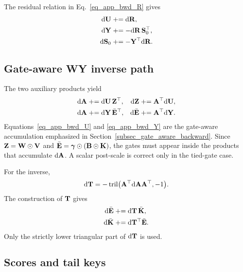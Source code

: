 The residual relation in Eq.~\ref{eq_app_bwd_R} gives
\begin{align}
    \mathrm{d}{\mathbf{U}}
    &\mathrel{+}=
    \mathrm{d}{\mathbf{R}},
\label{eq_app_dU_from_R}\\
    \mathrm{d}{\mathbf{Y}}
    &\mathrel{+}=
    -\mathrm{d}{\mathbf{R}}\,{\mathbf{S}}_0^\top,
\label{eq_app_dY_from_R}\\
    \mathrm{d}{\mathbf{S}}_0
    &\mathrel{+}=
    -{\mathbf{Y}}^\top\mathrm{d}{\mathbf{R}} .
\label{eq_app_dS_from_R}
\end{align}

\subsection{Gate-aware WY inverse path}
\label{app_bwd_wy}

The two auxiliary products yield
\begin{align}
    \mathrm{d}{\mathbf{A}}
    &\mathrel{+}=
    \mathrm{d}{\mathbf{U}}\,{\mathbf{Z}}^\top,
    &
    \mathrm{d}{\mathbf{Z}}
    &\mathrel{+}=
    {\mathbf{A}}^\top\mathrm{d}{\mathbf{U}},
\label{eq_app_bwd_U}\\
    \mathrm{d}{\mathbf{A}}
    &\mathrel{+}=
    \mathrm{d}{\mathbf{Y}}\,\bar{{\mathbf{E}}}^\top,
    &
    \mathrm{d}\bar{{\mathbf{E}}}
    &\mathrel{+}=
    {\mathbf{A}}^\top\mathrm{d}{\mathbf{Y}} .
\label{eq_app_bwd_Y}
\end{align}
Equations~\ref{eq_app_bwd_U} and \ref{eq_app_bwd_Y} are the gate-aware accumulation emphasized in Section~\ref{subsec_gate_aware_backward}. Since ${\mathbf{Z}}={\mathbf{W}}\odot{\mathbf{V}}$ and $\bar{{\mathbf{E}}}=\boldsymbol{\gamma}\odot({\mathbf{B}}\odot{\mathbf{K}})$, the gates must appear inside the products that accumulate $\mathrm{d}{\mathbf{A}}$. A scalar post-scale is correct only in the tied-gate case.

For the inverse,
\begin{align}
    \mathrm{d}{\mathbf{T}}
    =
    -\operatorname{tril}
    \bigl(
    {\mathbf{A}}^\top\mathrm{d}{\mathbf{A}}{\mathbf{A}}^\top,
    -1
    \bigr).
\label{eq_app_dT}
\end{align}
The construction of ${\mathbf{T}}$ gives
\begin{align}
    \mathrm{d}\bar{{\mathbf{E}}}
    &\mathrel{+}=
    \mathrm{d}{\mathbf{T}}\,\bar{{\mathbf{K}}},
\label{eq_app_dE_from_T}\\
    \mathrm{d}\bar{{\mathbf{K}}}
    &\mathrel{+}=
    \mathrm{d}{\mathbf{T}}^\top\bar{{\mathbf{E}}}.
\label{eq_app_dKbar_from_T}
\end{align}
Only the strictly lower triangular part of $\mathrm{d}{\mathbf{T}}$ is used.

\subsection{Scores and tail keys}
\label{app_bwd_scores}

